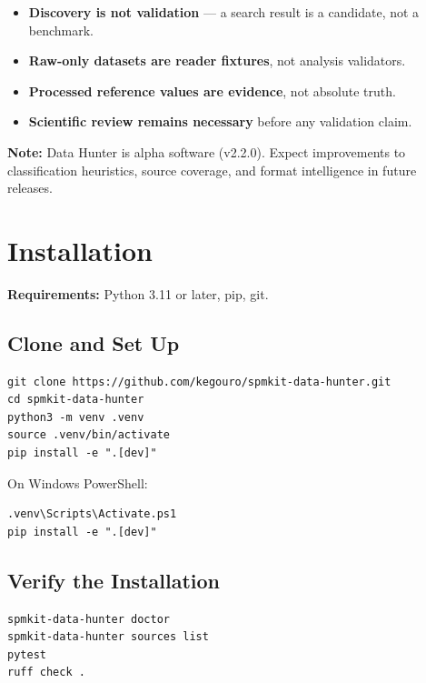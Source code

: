\documentclass[11pt,a4paper]{article}
\begin{document}
\begin{itemize}[nosep]
  \item \textbf{Discovery is not validation} --- a search result is a candidate, not a benchmark.
  \item \textbf{Raw-only datasets are reader fixtures}, not analysis validators.
  \item \textbf{Processed reference values are evidence}, not absolute truth.
  \item \textbf{Scientific review remains necessary} before any validation claim.
\end{itemize}

\bigskip
\begin{infobox}
\textbf{Note:} Data Hunter is alpha software (v2.2.0). Expect improvements to classification heuristics, source coverage, and format intelligence in future releases.
\end{infobox}

\section{Installation}

\textbf{Requirements:} Python 3.11 or later, pip, git.

\subsection*{Clone and Set Up}

\begin{lstlisting}
git clone https://github.com/kegouro/spmkit-data-hunter.git
cd spmkit-data-hunter
python3 -m venv .venv
source .venv/bin/activate
pip install -e ".[dev]"
\end{lstlisting}

On Windows PowerShell:

\begin{lstlisting}
.venv\Scripts\Activate.ps1
pip install -e ".[dev]"
\end{lstlisting}

\subsection*{Verify the Installation}

\begin{lstlisting}
spmkit-data-hunter doctor
spmkit-data-hunter sources list
pytest
ruff check .
\end{lstlisting}
\end{document}
